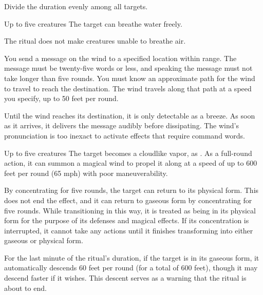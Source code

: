 \spellspecial Divide the duration evenly among all targets.
\begin{spelltargets}{Up to five creatures}
    \spelleffect The target can breathe water freely. 
\end{spelltargets}
\spellnotes The ritual does not make creatures unable to breathe air.

\spelleffect You send a message on the wind to a specified location within range. The message must be twenty-five words or less, and speaking the message must not take longer than five rounds. You must know an approximate path for the wind to travel to reach the destination. The wind travels along that path at a speed you specify, up to 50 feet per round.

Until the wind reaches its destination, it is only detectable as a breeze. As soon as it arrives, it delivers the message audibly before dissipating.
\spellnotes The wind's pronunciation is too inexact to activate effects that require command words.

\begin{spelltargets}{Up to five creatures}
    \spelleffect The target becomes a cloudlike vapor, as . As a full-round action, it can summon a magical wind to propel it along at a speed of up to 600 feet per round (65 mph) with poor maneuverability.

    By concentrating for five rounds, the target can return to its physical form. This does not end the effect, and it can return to gaseous form by concentrating for five rounds. While transitioning in this way, it is treated as being in its physical form for the purpose of its defenses and magical effects. If its concentration is interrupted, it cannot take any actions until it finishes transforming into either gaseous or physical form.

For the last minute of the ritual's duration, if the target is in its gaseous form, it automatically descends 60 feet per round (for a total of 600 feet), though it may descend faster if it wishes. This descent serves as a warning that the ritual is about to end.
\end{spelltargets}

